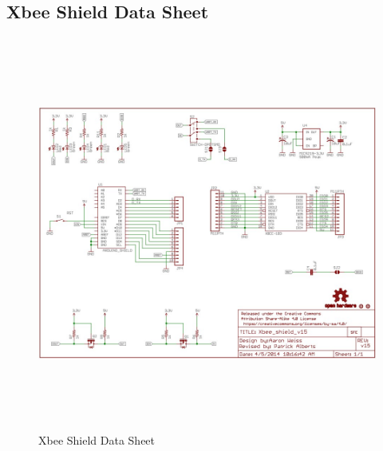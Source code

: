 \documentclass[12pt]{article}
\begin{document}
{{{{		\subsection{Xbee Shield Data Sheet}
			\begin{figure}[ht!]
				\centering
				\includegraphics[height=130mm]{assets/Xbee_Shield_DataSheet.jpg}
				\caption{Xbee Shield Data Sheet \label{overflow}}
			\end{figure}
		
			\clearpage
		
}}}}
\end{document}
